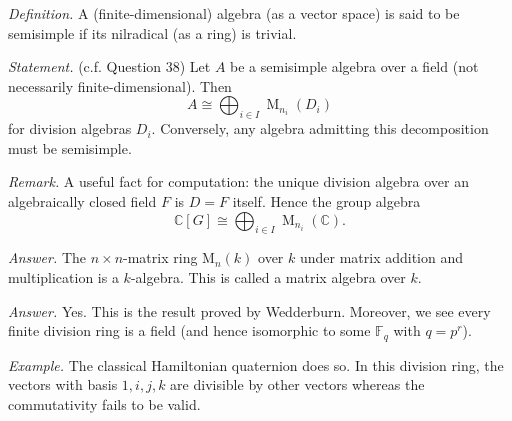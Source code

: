 \documentclass{mathproblems}
\newcommand\C{\mathbb{C}}
\newcommand\F{\mathbb{F}}
\begin{document}
\begin{questions}
\textit{Definition.} A (finite-dimensional) algebra (as a vector space) is said to be semisimple if its nilradical (as a ring) is trivial.

\textit{Statement.} (c.f. Question 38) Let $A$ be a semisimple algebra over a field (not necessarily finite-dimensional). Then
$$
A\cong \bigoplus_{i\in I} \operatorname{M}_{n_i}(D_i)
$$
for division algebras $D_i$. Conversely, any algebra admitting this decomposition must be semisimple.

\textit{Remark.} A useful fact for computation: the unique division algebra over an algebraically closed field $F$ is $D=F$ itself. Hence the group algebra
$$
\C[G]\cong \bigoplus_{i\in I} \operatorname{M}_{n_i}(\C).
$$


\textit{Answer.} The $n\times n$-matrix ring $\mathrm{M}_n(k)$ over $k$ under matrix addition and multiplication is a $k$-algebra. This is called a matrix algebra over $k$.







\textit{Answer.} Yes. This is the result proved by Wedderburn. Moreover, we see every finite division ring is a field (and hence isomorphic to some $\F_q$ with $q=p^r$).

\textit{Example.} The classical Hamiltonian quaternion does so. In this division ring, the vectors with basis ${1,i,j,k}$ are divisible by other vectors whereas the commutativity fails to be valid. 



\end{questions}
\end{document}

